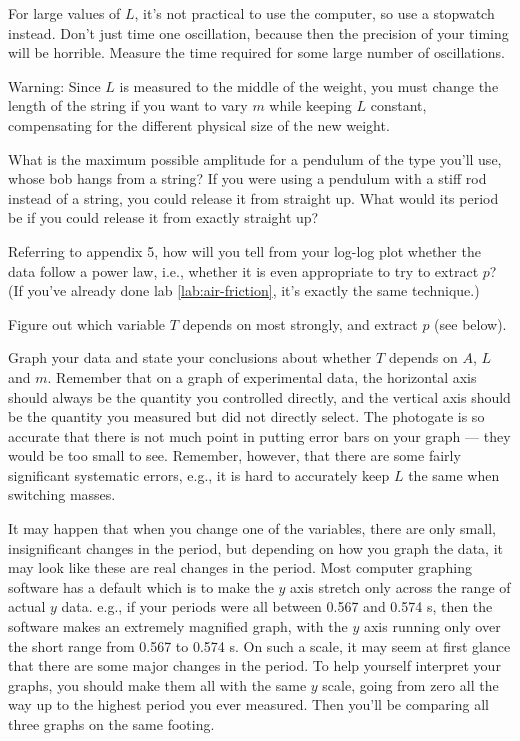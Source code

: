 For large values of $L$, it's not practical to use the computer, so
use a stopwatch instead. Don't just time one oscillation, because then
the precision of your timing will be horrible. Measure the time required
for some large number of oscillations.

Warning: Since $L$ is measured to the middle of the weight,
you must change the length of the string if you want to vary
$m$ while keeping $L$ constant, compensating for the
different physical size of the new weight.

\prelab

\prelabquestion  What is the maximum possible amplitude for a pendulum of
the type you'll use, whose bob hangs from a string?  If you
were using a pendulum with a stiff rod instead of a string,
you could release it from straight up.  What would its
period be if you could release it from exactly straight up?

\prelabquestion  Referring to appendix 5, how will you
tell from your log-log plot whether the
data follow a power law, i.e., whether it is even appropriate
to try to extract $p$? (If you've already done lab \ref{lab:air-friction},
it's exactly the same technique.)

\selfcheck

Figure out which variable $T$ depends on most strongly, and
extract $p$ (see below).

\analysis

Graph your data and state your conclusions about whether $T$
depends on $A$, $L$ and $m$.  Remember that on a graph of
experimental data, the horizontal axis should always be the
quantity you controlled directly, and the vertical axis
should be the quantity you measured but did not directly
select. The photogate is so accurate that there is not much
point in putting error bars on your graph --- they would be
too small to see. Remember, however, that there are some
fairly significant systematic errors, e.g., it is hard to
accurately keep $L$ the same when switching masses.

It may happen that when you change one of the variables,
there are only small, insignificant changes in the period,
but depending on how you graph the data, it may look like
these are real changes in the period. Most computer graphing
software has a default which is to make the $y$ axis stretch
only across the range of actual $y$ data. e.g., if your
periods were all between 0.567 and 0.574 s, then the
software makes an extremely magnified graph, with the $y$
axis running only over the short range from 0.567 to 0.574
s. On such a scale, it may seem at first glance that there
are some major changes in the period. To help yourself
interpret your graphs, you should make them all with the
same $y$ scale, going from zero all the way up to the
highest period you ever measured. Then you'll be comparing
all three graphs on the same footing.

